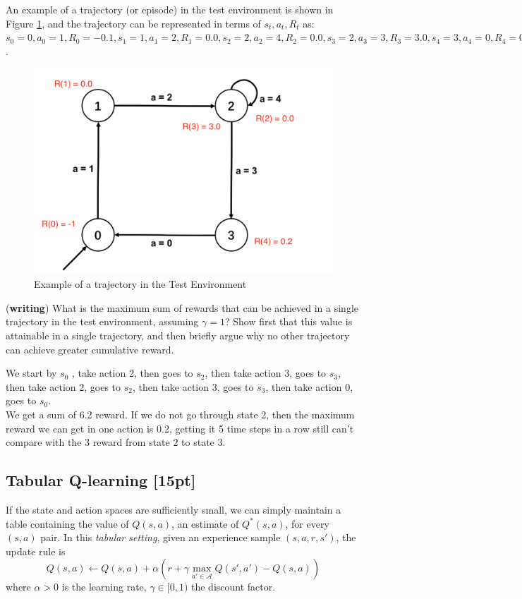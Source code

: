 \documentclass[11pt]{article}
\theoremstyle{case}
\begin{document}
An example of a trajectory (or episode) in the test environment is shown in Figure \ref{fig:test_env}, and the trajectory can be represented in terms of $s_t, a_t, R_t$ as: 
$s_0 = 0, a_0=1, R_0 = -0.1, s_1=1, a_1=2, R_1 = 0.0, s_2=2, a_2=4, R_2 = 0.0, s_3=2, a_3=3, R_3  = 3.0, s_4=3, a_4=0, R_4 = 0.2, s_5=0 $.

\begin{figure}[h!]
  \centering
  \includegraphics[width=.45\linewidth]{test_env.png}
  \caption{Example of a trajectory in the Test Environment}
  \label{fig:test_env}
\end{figure}

({\bf writing}) What is the maximum sum of rewards that can be achieved in a single trajectory in the test environment, assuming $\gamma = 1$? Show first that this value is attainable in a single trajectory, and then briefly argue why no other trajectory can achieve greater cumulative reward.
\begin{shaded}
We start by $s_0$ , take action 2, then goes to $s_2$, then take action 3, goes to $s_3$, then take action 2, goes to $s_2$, then take action 3, goes to $s_3$, then take action 0, goes to $s_0$.\\
We get a sum of 6.2 reward. If we do not go through state 2, then the maximum reward we can get in one action is 0.2, getting it 5 time steps in a row still can't compare with the 3 reward from state 2 to state 3.
\end{shaded}

\subsection{Tabular Q-learning [15pt]}
If the state and action spaces are sufficiently small, we can simply maintain a table containing the value of $Q(s,a)$, an estimate of $Q^*(s,a)$, for every $(s,a)$ pair.
In this \emph{tabular setting}, given an experience sample $(s, a, r, s')$, the update rule is
\begin{equation}
Q(s,a) \leftarrow Q(s,a) + \alpha\left(r + \gamma \max_{a' \in \mathcal{A}}Q(s',a') - Q(s,a)\right) \label{eqn:tabularq}
\end{equation}
where $\alpha > 0$ is the learning rate, $\gamma \in [0,1)$ the discount factor.
\end{document}
